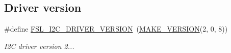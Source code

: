 \subsection*{Driver version}
\begin{DoxyCompactItemize}
\item 
\mbox{\label{group__i2c__driver_ga60fdaec284298758a650ce1122aef231}} 
\#define \mbox{\hyperlink{group__i2c__driver_ga60fdaec284298758a650ce1122aef231}{F\+S\+L\+\_\+\+I2\+C\+\_\+\+D\+R\+I\+V\+E\+R\+\_\+\+V\+E\+R\+S\+I\+ON}}~(\mbox{\hyperlink{group__ftfx__utilities_ga812138aa3315b0c6953c1a26130bcc37}{M\+A\+K\+E\+\_\+\+V\+E\+R\+S\+I\+ON}}(2, 0, 8))
\begin{DoxyCompactList}\small\item\em I2C driver version 2... \end{DoxyCompactList}\end{DoxyCompactItemize}

